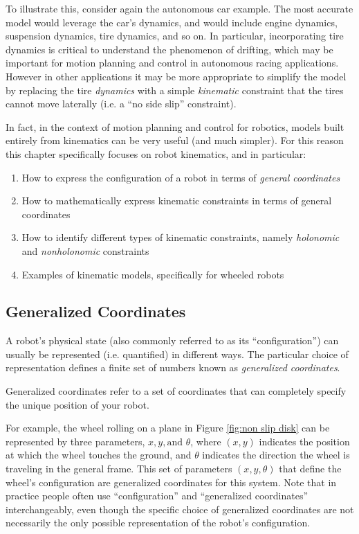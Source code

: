 To illustrate this, consider again the autonomous car example. The most accurate model would leverage the car's dynamics, and would include engine dynamics, suspension dynamics, tire dynamics, and so on. In particular, incorporating tire dynamics is critical to understand the phenomenon of drifting, which may be important for motion planning and control in autonomous racing applications. However in other applications it may be more appropriate to simplify the model by replacing the tire \textit{dynamics} with a simple \textit{kinematic} constraint that the tires cannot move laterally (i.e. a ``no side slip'' constraint).

In fact, in the context of motion planning and control for robotics, models built entirely from kinematics can be very useful (and much simpler). For this reason this chapter specifically focuses on robot kinematics, and in particular:
\begin{enumerate}
    \item How to express the configuration of a robot in terms of \textit{general coordinates}
    \item How to mathematically express kinematic constraints in terms of general coordinates
    \item How to identify different types of kinematic constraints, namely \textit{holonomic} and \textit{nonholonomic} constraints
    \item Examples of kinematic models, specifically for wheeled robots
\end{enumerate}


\subsection{Generalized Coordinates}
A robot's physical state (also commonly referred to as its ``configuration'') can usually be represented (i.e. quantified) in different ways. The particular choice of representation defines a finite set of numbers known as \textit{generalized coordinates}.

\begin{definition}
Generalized coordinates refer to a set of coordinates that can completely specify the unique position of your robot.
\end{definition}

For example, the wheel rolling on a plane in Figure \ref{fig:non slip disk} can be represented by three parameters, $x, y,\text{and } \theta$, where $(x, y)$ indicates the position at which the wheel touches the ground, and $\theta$ indicates the direction the wheel is traveling in the general frame. This set of parameters $(x,y, \theta)$ that define the wheel's configuration are generalized coordinates for this system. Note that in practice people often use ``configuration'' and ``generalized coordinates'' interchangeably, even though the specific choice of generalized coordinates are not necessarily the only possible representation of the robot's configuration.


